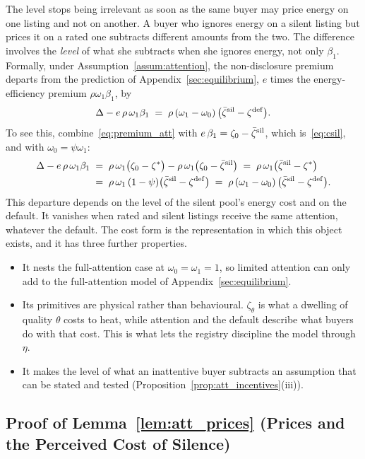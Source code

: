 The level stops being irrelevant as soon as the same buyer may price energy on one listing and not on another. A buyer who ignores energy on a silent listing but prices it on a rated one subtracts different amounts from the two. The difference involves the \emph{level} of what she subtracts when she ignores energy, not only $\beta_1$. Formally, under Assumption~\ref{assum:attention}, the non-disclosure premium departs from the prediction of Appendix~\ref{sec:equilibrium}, $e$ times the energy-efficiency premium $\rho\omega_1\beta_1$, by
\begin{equation*}
    \Delta-e\,\rho\,\omega_1\beta_1\;=\;\rho\,(\omega_1-\omega_0)\,\big(\bar \zeta^{\rm sil}-\zeta^{\rm def}\big).
\end{equation*}
To see this, combine~\eqref{eq:premium_att} with $e\,\beta_1=\zeta_0-\bar \zeta^{\rm sil}$, which is~\eqref{eq:csil}, and with $\omega_0=\psi\omega_1$:
\begin{align*}
    \Delta-e\,\rho\,\omega_1\beta_1
    &\;=\;\rho\,\omega_1\big(\zeta_0-\zeta^*\big)-\rho\,\omega_1\big(\zeta_0-\bar \zeta^{\rm sil}\big)
    \;=\;\rho\,\omega_1\big(\bar \zeta^{\rm sil}-\zeta^*\big)\\
    &\;=\;\rho\,\omega_1\,(1-\psi)\big(\bar \zeta^{\rm sil}-\zeta^{\rm def}\big)
    \;=\;\rho\,(\omega_1-\omega_0)\,\big(\bar \zeta^{\rm sil}-\zeta^{\rm def}\big).
\end{align*}
This departure depends on the level of the silent pool's energy cost and on the default. It vanishes when rated and silent listings receive the same attention, whatever the default. The cost form is the representation in which this object exists, and it has three further properties.
\begin{itemize}
    \item It nests the full-attention case at $\omega_0=\omega_1=1$, so limited attention can only add to the full-attention model of Appendix~\ref{sec:equilibrium}.
    \item Its primitives are physical rather than behavioural. $\zeta_\theta$ is what a dwelling of quality $\theta$ costs to heat, while attention and the default describe what buyers do with that cost. This is what lets the registry discipline the model through $\eta$.
    \item It makes the level of what an inattentive buyer subtracts an assumption that can be stated and tested (Proposition~\ref{prop:att_incentives}(iii)).
\end{itemize}


\subsection*{Proof of Lemma~\ref{lem:att_prices} (Prices and the Perceived Cost of Silence)}

